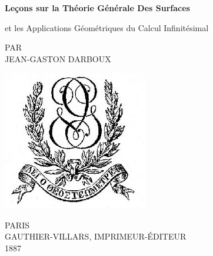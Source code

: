\clearpage
\newcommand\nbvspace[1][3]{\vspace*{\stretch{#1}}}
\newcommand\nbstretchyspace{\spaceskip0.5em plus 0.25em minus 0.25em}
\newcommand{\nbtitlestretch}{\spaceskip0.6em}
\pagestyle{empty}
\begin{center}
\bfseries
\nbvspace[1]
\Huge
{\huge
Leçons sur la Théorie Générale Des Surfaces}

\normalsize

et les Applications Géométriques du Calcul Infinitésimal

\nbvspace[1]
\small PAR\\
\Large JEAN-GASTON DARBOUX\\[0.5em]

\nbvspace[2]

\includegraphics[width=2.5in]{../images/Logo_Gauthier-Villars.png}
\nbvspace[3]
\normalsize

PARIS\\
\large
GAUTHIER-VILLARS, IMPRIMEUR-\'EDITEUR \\
1887
\nbvspace[1]
\end{center}
